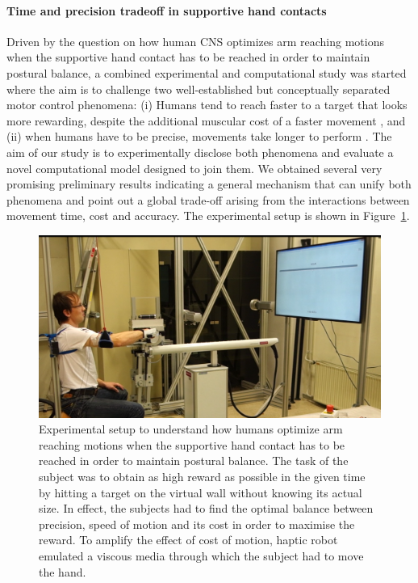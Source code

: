 \documentclass[final,5p,twocolumn]{elsarticle}
\begin{document}
\paragraph{Time and precision tradeoff in supportive hand contacts} Driven by the question on how human CNS optimizes arm reaching motions when the supportive hand contact has to be reached in order to maintain postural balance, a combined experimental and computational study was started where the aim is to challenge two well-established but conceptually separated motor control phenomena: (i) Humans tend to reach faster to a target that looks more rewarding, despite the additional muscular cost of a faster movement \cite{Fitts1954}, and (ii) when humans have to be precise, movements take longer to perform \cite{Shadmehr2010}. The aim of our study is to experimentally disclose both phenomena and evaluate a novel computational model designed to join them. We obtained several very promising preliminary results indicating a general mechanism that can unify both phenomena and point out a global trade-off arising from the interactions between movement time, cost and accuracy. The experimental setup is shown in Figure~\ref{fig:UnifyingTwoPhenomena}.


\begin{figure}
\centering
\includegraphics[width=\linewidth]{images/UnifyingTwoPhenomena.png}
\caption{Experimental setup to understand how humans optimize arm reaching motions when the supportive hand contact has to be reached in order to maintain postural balance. The task of the subject was to obtain as high reward as possible in the given time by hitting a target on the virtual wall without knowing its actual size. In effect, the subjects had to find the optimal balance between precision, speed of motion and its cost in order to maximise the reward. To amplify the effect of cost of motion, haptic robot emulated a viscous media through which the subject had to move the hand.
}
\label{fig:UnifyingTwoPhenomena}
\end{figure}
\end{document}
